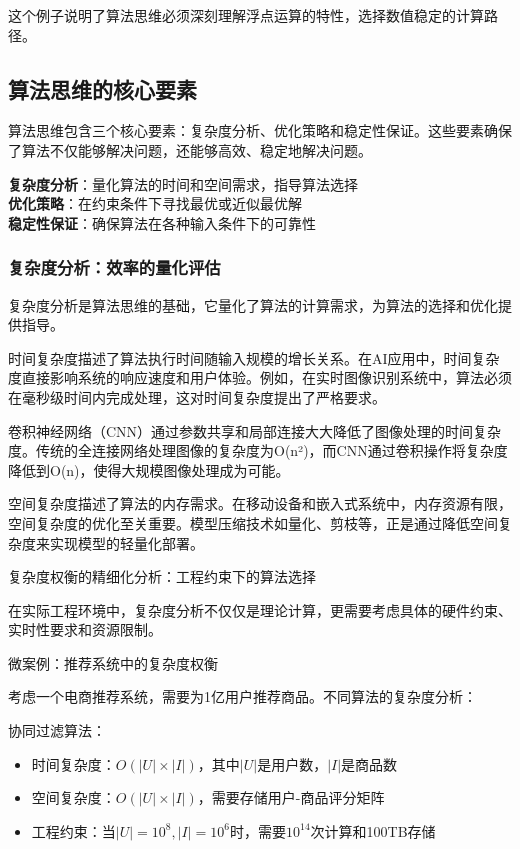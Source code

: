 这个例子说明了算法思维必须深刻理解浮点运算的特性，选择数值稳定的计算路径。

\subsection{算法思维的核心要素}

算法思维包含三个核心要素：复杂度分析、优化策略和稳定性保证。这些要素确保了算法不仅能够解决问题，还能够高效、稳定地解决问题。

\begin{tcolorbox}[colback=orange!5!white,colframe=orange!75!black,title=核心要素：算法思维的三大支柱]
\textbf{复杂度分析}：量化算法的时间和空间需求，指导算法选择\\
\textbf{优化策略}：在约束条件下寻找最优或近似最优解\\
\textbf{稳定性保证}：确保算法在各种输入条件下的可靠性
\end{tcolorbox}

\subsubsection{复杂度分析：效率的量化评估}

复杂度分析是算法思维的基础，它量化了算法的计算需求，为算法的选择和优化提供指导。

时间复杂度描述了算法执行时间随输入规模的增长关系。在AI应用中，时间复杂度直接影响系统的响应速度和用户体验。例如，在实时图像识别系统中，算法必须在毫秒级时间内完成处理，这对时间复杂度提出了严格要求。

卷积神经网络（CNN）通过参数共享和局部连接大大降低了图像处理的时间复杂度。传统的全连接网络处理图像的复杂度为O(n²)，而CNN通过卷积操作将复杂度降低到O(n)，使得大规模图像处理成为可能。

空间复杂度描述了算法的内存需求。在移动设备和嵌入式系统中，内存资源有限，空间复杂度的优化至关重要。模型压缩技术如量化、剪枝等，正是通过降低空间复杂度来实现模型的轻量化部署。

复杂度权衡的精细化分析：工程约束下的算法选择

在实际工程环境中，复杂度分析不仅仅是理论计算，更需要考虑具体的硬件约束、实时性要求和资源限制。

微案例：推荐系统中的复杂度权衡

考虑一个电商推荐系统，需要为1亿用户推荐商品。不同算法的复杂度分析：

协同过滤算法：
\begin{itemize}
\item 时间复杂度：$O(|U| \times |I|)$，其中$|U|$是用户数，$|I|$是商品数
\item 空间复杂度：$O(|U| \times |I|)$，需要存储用户-商品评分矩阵
\item 工程约束：当$|U|=10^8, |I|=10^6$时，需要$10^{14}$次计算和100TB存储
\end{itemize}

